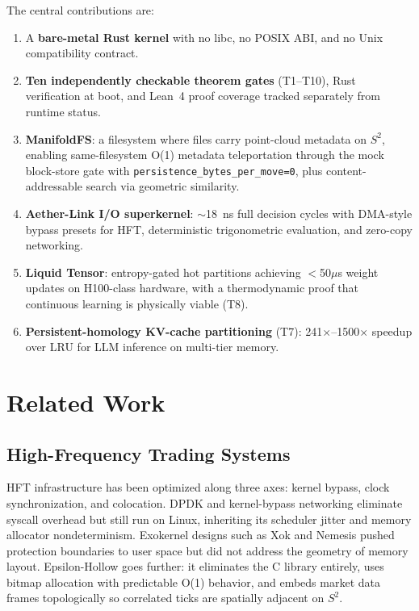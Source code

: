 \documentclass[11pt, a4paper]{article}
\theoremstyle{proofform}
\numberwithin{innerpoints}{subsection}
\numberwithin{disproof}{subsection}
\theoremstyle{mathproof}
\begin{document}
The central contributions are:
\begin{enumerate}[nosep]
  \item A \textbf{bare-metal Rust kernel} with no libc, no POSIX ABI, and no Unix compatibility contract.
  \item \textbf{Ten independently checkable theorem gates} (T1--T10), Rust verification at boot, and Lean~4 proof coverage tracked separately from runtime status.
  \item \textbf{ManifoldFS}: a filesystem where files carry point-cloud metadata on $S^2$, enabling same-filesystem O(1) metadata teleportation through the mock block-store gate with \texttt{persistence\_bytes\_per\_move=0}, plus content-addressable search via geometric similarity.
  \item \textbf{Aether-Link I/O superkernel}: $\sim$18~ns full decision cycles with DMA-style bypass presets for HFT, deterministic trigonometric evaluation, and zero-copy networking.
  \item \textbf{Liquid Tensor}: entropy-gated hot partitions achieving $<$50$\mu$s weight updates on H100-class hardware, with a thermodynamic proof that continuous learning is physically viable (T8).
  \item \textbf{Persistent-homology KV-cache partitioning} (T7): 241$\times$--1500$\times$ speedup over LRU for LLM inference on multi-tier memory.
\end{enumerate}

\section{Related Work}
\label{sec:related}

\subsection{High-Frequency Trading Systems}

HFT infrastructure has been optimized along three axes: kernel bypass, clock synchronization, and colocation. DPDK and kernel-bypass networking eliminate syscall overhead but still run on Linux, inheriting its scheduler jitter and memory allocator nondeterminism. Exokernel designs such as Xok and Nemesis pushed protection boundaries to user space but did not address the geometry of memory layout. Epsilon-Hollow goes further: it eliminates the C library entirely, uses bitmap allocation with predictable O(1) behavior, and embeds market data frames topologically so correlated ticks are spatially adjacent on $S^2$.
\end{document}
